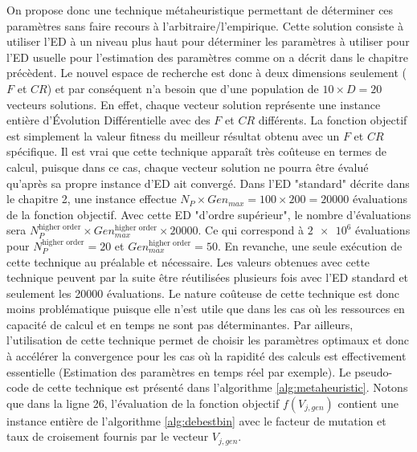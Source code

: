 On propose donc une technique métaheuristique permettant de déterminer ces paramètres sans faire recours à l'arbitraire/l'empirique. Cette solution consiste à utiliser l'ED à un niveau plus haut pour déterminer les paramètres à utiliser pour l'ED usuelle pour l'estimation des paramètres comme on a décrit dans le chapitre précèdent. Le nouvel espace de recherche est donc à deux dimensions seulement ($F$ et $CR$) et par conséquent n'a besoin que d'une population de $10 \times D = 20$ vecteurs solutions. En effet, chaque vecteur solution représente une instance entière d'Évolution Différentielle avec des $F$ et $CR$ différents. La fonction objectif est simplement la valeur fitness du meilleur résultat obtenu avec un $F$ et $CR$ spécifique. Il est vrai que cette technique apparaît très coûteuse en termes de calcul, puisque dans ce cas, chaque vecteur solution ne pourra être évalué qu'après sa propre instance d'ED ait convergé. Dans l'ED "standard" décrite dans le chapitre 2, une instance effectue $N_P \times Gen_{max} = 100 \times 200 = 20000$ évaluations de la fonction objectif. Avec cette ED "d'ordre supérieur", le nombre d'évaluations sera $N_{P}^{\text{higher order}} \times Gen_{max}^{\text{higher order}} \times 20000$. Ce qui correspond à $\num{2e6}$ évaluations pour $N_{P}^{\text{higher order}} = 20$ et  $Gen_{max}^{\text{higher order}} = 50$. En revanche, une seule exécution de cette technique au préalable et nécessaire. Les valeurs obtenues avec cette technique peuvent par la suite être réutilisées plusieurs fois avec l'ED standard et seulement les 20000 évaluations. Le nature coûteuse de cette technique est donc moins problématique puisque elle n'est utile que dans les cas où les ressources en capacité de calcul et en temps ne sont pas déterminantes. Par ailleurs, l'utilisation de cette technique permet de choisir les paramètres optimaux et donc à accélérer la convergence pour les cas où la rapidité des calculs est effectivement essentielle (Estimation des paramètres en temps réel par exemple). Le pseudo-code de cette technique est présenté dans l'algorithme \ref{alg:metaheuristic}. Notons que dans la ligne 26, l'évaluation de la fonction objectif $f(V_{j,gen})$ contient une instance entière de l'algorithme \ref{alg:debestbin} avec le facteur de mutation et taux de croisement fournis par le vecteur $V_{j,gen}$.

